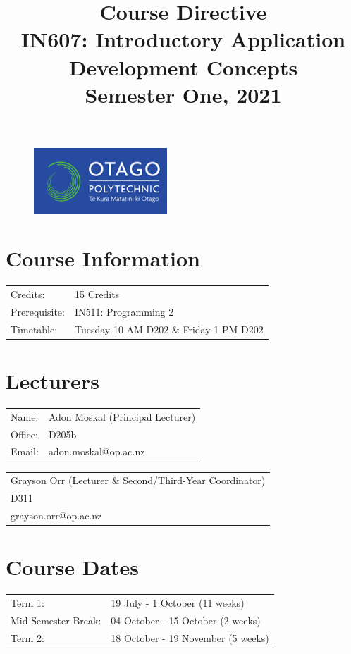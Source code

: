 \documentclass{article}
\author{}
\begin{document}
\begin{figure}
	\includegraphics[width=50mm]{../img/logo.png} 
\end{figure}

\title{Course Directive\\IN607: Introductory Application Development Concepts\\Semester One, 2021}
\date{}
\maketitle

\section*{Course Information}
\begin{tabular}{ll}
	Credits:            & 15 Credits                             \\
	Prerequisite:       & IN511: Programming 2                   \\
	Timetable:  & Tuesday 10 AM D202 \& Friday 1 PM D202       
\end{tabular} 

\section*{Lecturers}
\begin{tabular}{ll}
	Name:   & Adon Moskal (Principal Lecturer) \\
	Office: & D205b                            \\
	Email:  & adon.moskal@op.ac.nz             \\
\end{tabular}
\begin{tabular}{l}
	Grayson Orr (Lecturer \& Second/Third-Year Coordinator) \\
	D311                   \\
	grayson.orr@op.ac.nz   \\
\end{tabular}

\section*{Course Dates}
\begin{tabular}{ll} 
	Term 1:             & 19 July - 1 October (11 weeks) \\
	Mid Semester Break: & 04 October - 15 October (2 weeks)    \\
	Term 2:             & 18 October - 19 November (5 weeks)          
\end{tabular}
\end{document}
